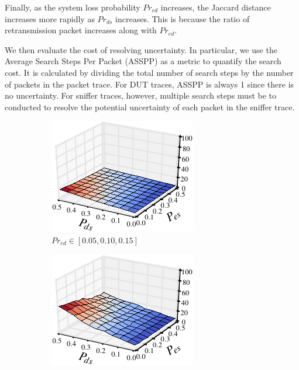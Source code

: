 Finally, as the system loss probability $Pr_{ed}$ increases, the Jaccard
distance increases more rapidly as $Pr_{ds}$ increases.  This is because the
ratio of retransmission packet increases along with $Pr_{ed}$.


We then evaluate the cost of resolving uncertainty. In particular, we use
the Average Search Steps Per Packet (ASSPP) as a metric to quantify the search
cost.  It is calculated by dividing the total number of search steps by the
number of packets in the packet trace. For DUT traces, ASSPP is always 1 since
there is no uncertainty. For sniffer traces, however, multiple search steps must
be to conducted to resolve the potential uncertainty of each packet in the
sniffer trace.

\begin{figure}[t!]
  \centering
  \begin{subfigure}{0.33\textwidth}
    \centering
    \includegraphics[width=\textwidth]{./figures/scripts/StepCount3DFigure_0_10.pdf}
    \caption{$Pr_{ed} \in [0.05, 0.10, 0.15]$}
  \end{subfigure}\hspace*{0.01\textwidth}
  \begin{subfigure}{0.33\textwidth}
    \centering
    \includegraphics[width=\textwidth]{./figures/scripts/StepCount3DFigure_0_30.pdf}

\end{subfigure}
\end{figure}
